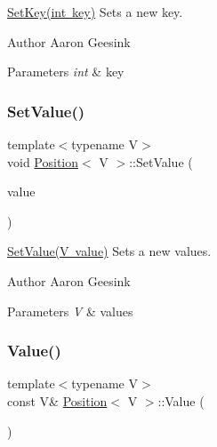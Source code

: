 \mbox{\hyperlink{class_position_a7605869eac2d7796bab440c7ff306a2d}{Set\+Key(int key)}} Sets a new key. 

\begin{DoxyAuthor}{Author}
Aaron Geesink 
\end{DoxyAuthor}

\begin{DoxyParams}{Parameters}
{\em int} & key \\
\hline
\end{DoxyParams}
\mbox{\label{class_position_a643b913908871f0b8fa78345545983b0}} 
\subsubsection{\texorpdfstring{SetValue()}{SetValue()}}
{\footnotesize\ttfamily template$<$typename V$>$ \\
void \mbox{\hyperlink{class_position}{Position}}$<$ V $>$\+::Set\+Value (\begin{DoxyParamCaption}\item[{V}]{value }\end{DoxyParamCaption})\hspace{0.3cm}{\ttfamily [inline]}}



\mbox{\hyperlink{class_position_a643b913908871f0b8fa78345545983b0}{Set\+Value(\+V value)}} Sets a new values. 

\begin{DoxyAuthor}{Author}
Aaron Geesink 
\end{DoxyAuthor}

\begin{DoxyParams}{Parameters}
{\em V} & values \\
\hline
\end{DoxyParams}
\mbox{\label{class_position_ae6da397a8c9f770cf8a87c719fe5868b}} 
\subsubsection{\texorpdfstring{Value()}{Value()}}
{\footnotesize\ttfamily template$<$typename V$>$ \\
const V\& \mbox{\hyperlink{class_position}{Position}}$<$ V $>$\+::Value (\begin{DoxyParamCaption}{ }\end{DoxyParamCaption})\hspace{0.3cm}{\ttfamily [inline]}}



